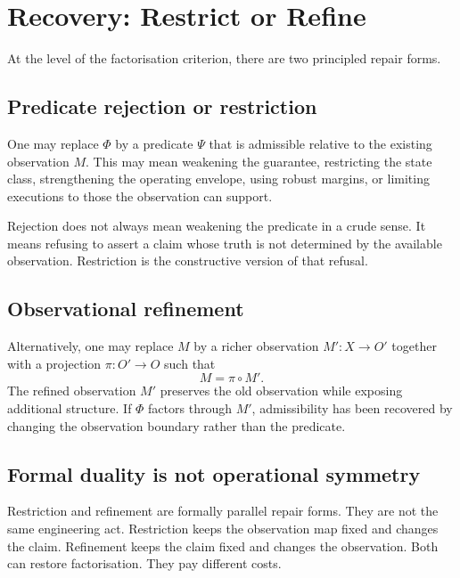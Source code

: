 \documentclass[a4paper,11pt]{article}
\begin{document}
\section{Recovery: Restrict or Refine}
\label{sec:recovery}

At the level of the factorisation criterion, there are two principled repair
forms.

\subsection{Predicate rejection or restriction}

One may replace \(\Phi\) by a predicate \(\Psi\) that is admissible relative to
the existing observation \(M\). This may mean weakening the guarantee,
restricting the state class, strengthening the operating envelope, using robust
margins, or limiting executions to those the observation can support.

Rejection does not always mean weakening the predicate in a crude sense. It
means refusing to assert a claim whose truth is not determined by the available
observation. Restriction is the constructive version of that refusal.

\subsection{Observational refinement}

Alternatively, one may replace \(M\) by a richer observation \(M' : X \to O'\)
together with a projection \(\pi : O' \to O\) such that
\[
  M = \pi \circ M'.
\]
The refined observation \(M'\) preserves the old observation while exposing
additional structure. If \(\Phi\) factors through \(M'\), admissibility has been
recovered by changing the observation boundary rather than the predicate.

\subsection{Formal duality is not operational symmetry}
\label{subsec:not-symmetric}

Restriction and refinement are formally parallel repair forms. They are not the
same engineering act. Restriction keeps the observation map fixed and changes
the claim. Refinement keeps the claim fixed and changes the observation. Both
can restore factorisation. They pay different costs.
\end{document}
